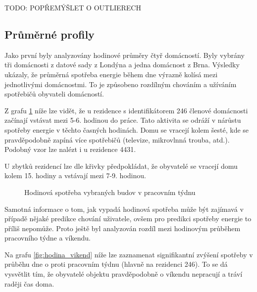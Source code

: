 \documentclass[FM,BP,fonts]{tulthesis}
\begin{document}
TODO: POPŘEMÝŠLET O OUTLIERECH

\newpage

\subsection{Průměrné profily}
Jako první byly analyzovány hodinové průměry čtyř domácností. Byly vybrány tři domácnosti z datové sady z Londýna a jedna domácnost z Brna. Výsledky ukázaly, že průměrná spotřeba energie během dne výrazně kolísá mezi jednotlivými domácnostmi. To je způsobeno rozdílným chováním a užíváním spotřebičů obyvateli domácností.

Z grafu \ref{fig:hodina_pracovni} níže lze vidět, že u rezidence s identifikátorem 246 členové domácnosti začínají vstávat mezi 5-6. hodinou do práce. Tato aktivita se odráží v nárůstu spotřeby energie v těchto časných hodinách. Domu se vracejí kolem šesté, kde se pravděpodobně zapíná více spotřebičů (televize, mikrovlnná trouba, atd.). Podobný vzor lze nalézt i u rezidence 4431.

U zbytků rezidencí lze dle křivky předpokládat, že obyvatelé se vracejí domu kolem 15. hodiny a vstávají mezi 7-9. hodinou.
 
\begin{figure}[htbp]
	\centering
	\caption{Hodinová spotřeba vybraných budov v pracovním týdnu}
	\label{fig:hodina_pracovni}
\end{figure}

Samotná informace o tom, jak vypadá hodinová spotřeba může být zajímavá v případě nějaké predikce chování uživatele, ovšem pro predikci spotřeby energie to příliš nepomůže. Proto ještě byl analyzován rozdíl mezi hodinovým průběhem pracovního týdne a víkendu.

Na grafu \ref{fig:hodina_vikend} níže lze zaznamenat signifikantní zvýšení spotřeby v průběhu dne o proti pracovním týdnu (hlavně na rezidenci 246). To se dá vysvětlit tím, že obyvatelé objektu pravděpodobně o víkendu nepracují a tráví raději čas doma.
\end{document}
